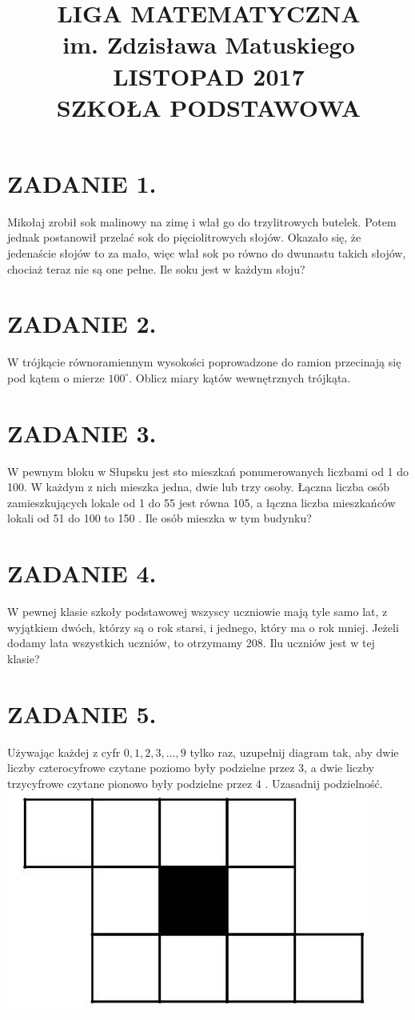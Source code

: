\documentclass[10pt]{article}
\title{LIGA MATEMATYCZNA \\
 im. Zdzisława Matuskiego LISTOPAD 2017 \\
 SZKOŁA PODSTAWOWA }
\author{}
\date{}
\begin{document}
\maketitle
\section*{ZADANIE 1.}
Mikołaj zrobił sok malinowy na zimę i wlał go do trzylitrowych butelek. Potem jednak postanowił przelać sok do pięciolitrowych słojów. Okazało się, że jedenaście słojów to za mało, więc wlał sok po równo do dwunastu takich słojów, chociaż teraz nie są one pełne. Ile soku jest w każdym słoju?

\section*{ZADANIE 2.}
W trójkącie równoramiennym wysokości poprowadzone do ramion przecinają się pod kątem o mierze \(100^{\circ}\). Oblicz miary kątów wewnętrznych trójkąta.

\section*{ZADANIE 3.}
W pewnym bloku w Słupsku jest sto mieszkań ponumerowanych liczbami od 1 do 100. W każdym z nich mieszka jedna, dwie lub trzy osoby. Łączna liczba osób zamieszkujących lokale od 1 do 55 jest równa 105, a łączna liczba mieszkańców lokali od 51 do 100 to 150 . Ile osób mieszka w tym budynku?

\section*{ZADANIE 4.}
W pewnej klasie szkoły podstawowej wszyscy uczniowie mają tyle samo lat, z wyjątkiem dwóch, którzy są o rok starsi, i jednego, który ma o rok mniej. Jeżeli dodamy lata wszystkich uczniów, to otrzymamy 208. Ilu uczniów jest w tej klasie?

\section*{ZADANIE 5.}
Używając każdej z cyfr \(0,1,2,3, \ldots, 9\) tylko raz, uzupełnij diagram tak, aby dwie liczby czterocyfrowe czytane poziomo były podzielne przez 3, a dwie liczby trzycyfrowe czytane pionowo były podzielne przez 4 . Uzasadnij podzielność.\\
\includegraphics[max width=\textwidth, center]{2024_11_21_7e7fc96a5aa198d77b29g-1}
\end{document}
